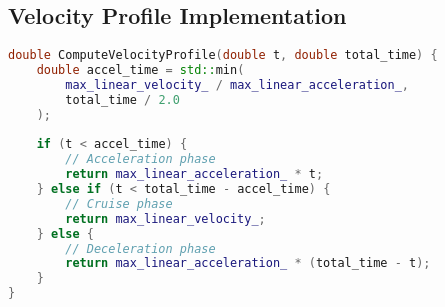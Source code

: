 \documentclass[11pt]{article}
\begin{document}
\subsection{Velocity Profile Implementation}

\begin{lstlisting}[language=C++, caption=Trapezoidal Velocity Profile]
double ComputeVelocityProfile(double t, double total_time) {
    double accel_time = std::min(
        max_linear_velocity_ / max_linear_acceleration_,
        total_time / 2.0
    );
    
    if (t < accel_time) {
        // Acceleration phase
        return max_linear_acceleration_ * t;
    } else if (t < total_time - accel_time) {
        // Cruise phase
        return max_linear_velocity_;
    } else {
        // Deceleration phase
        return max_linear_acceleration_ * (total_time - t);
    }
}
\end{lstlisting}
\end{document}
